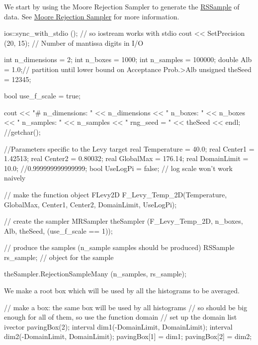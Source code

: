 \-We start by using the \-Moore \-Rejection \-Sampler to generate the \hyperlink{classRSSample}{\-R\-S\-Sample} of data. \-See \hyperlink{moorerejsam}{\-Moore \-Rejection \-Sampler} for more information.


\begin{DoxyCodeInclude}
    ios::sync_with_stdio (); // so iostream works with stdio
    cout << SetPrecision (20, 15);  // Number of mantissa digits in I/O


    int n_dimensions = 2;
    int n_boxes = 1000;
    int n_samples = 100000;
    double Alb = 1.0;// partition until lower bound on Acceptance Prob.>Alb
    unsigned theSeed = 12345;


    bool use_f_scale = true;

    cout << "# n_dimensions: " << n_dimensions << "  n_boxes: " << n_boxes
        << "  n_samples: " << n_samples << "  rng_seed = " << theSeed
        << endl; //getchar();

    //Parameters specific to the Levy target
    real Temperature = 40.0;
    real Center1 = 1.42513;
    real Center2 = 0.80032;
    real GlobalMax = 176.14;
    real DomainLimit = 10.0;    //0.999999999999999;
    bool UseLogPi = false; // log scale won't work naively

    // make the function object
    FLevy2D F_Levy_Temp_2D(Temperature, GlobalMax,
                        Center1, Center2, DomainLimit, UseLogPi);

    // create the sampler
    MRSampler theSampler (F_Levy_Temp_2D, n_boxes, Alb, theSeed,
                        (use_f_scale == 1));

    // produce the samples (n_sample samples should be produced)
    RSSample rs_sample; // object for the sample

    theSampler.RejectionSampleMany (n_samples, rs_sample);

\end{DoxyCodeInclude}


\-We make a root box which will be used by all the histograms to be averaged.


\begin{DoxyCodeInclude}
    // make a box: the same box will be used by all histograms
    // so should be big enough for all of them, so use the function domain
    // set up the domain list
    ivector pavingBox(2);
    interval dim1(-DomainLimit, DomainLimit);
    interval dim2(-DomainLimit, DomainLimit);
    pavingBox[1] = dim1;
    pavingBox[2] = dim2;

\end{DoxyCodeInclude}



